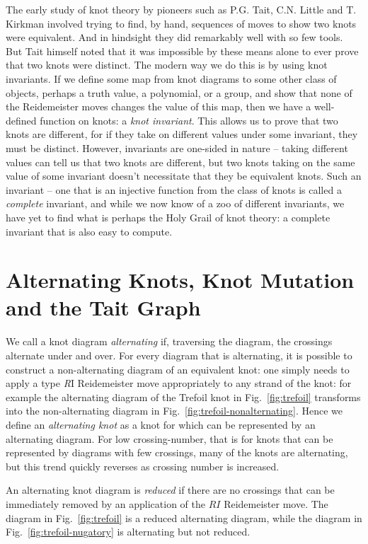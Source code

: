 \documentclass[12pt]{report}
\begin{document}
The early study of knot theory by pioneers such as P.G. Tait, C.N. Little and T. Kirkman involved trying to find, by hand, sequences of moves to show two knots were equivalent. And in hindsight they did remarkably well with so few tools. But Tait himself noted that it was impossible by these means alone to ever prove that two knots were distinct. The modern way we do this is by using knot invariants. If we define some map from knot diagrams to some other class of objects, perhaps a truth value, a polynomial, or a group, and show that none of the Reidemeister moves changes the value of this map, then we have a well-defined function on knots: a \textit{knot invariant}. This allows us to prove that two knots are different, for if they take on different values under some invariant, they must be distinct. However, invariants are one-sided in nature -- taking different values can tell us that two knots are different, but two knots taking on the same value of some invariant doesn't necessitate that they be equivalent knots. Such an invariant -- one that is an injective function from the class of knots is called a \textit{complete} invariant, and while we now know of a zoo of different invariants, we have yet to find what is perhaps the Holy Grail of knot theory: a complete invariant that is also easy to compute.

\section{Alternating Knots, Knot Mutation and the Tait Graph}
We call a knot diagram \textit{alternating} if, traversing the diagram, the crossings alternate under and over. For every diagram that is alternating, it is possible to construct a non-alternating diagram of an equivalent knot: one simply needs to apply a type \textit{R}I Reidemeister move appropriately to any strand of the knot: for example the alternating diagram of the Trefoil knot in Fig.~\ref{fig:trefoil} transforms into the non-alternating diagram in Fig.~\ref{fig:trefoil-nonalternating}. Hence we define an \textit{alternating knot} as a knot for which can be represented by an alternating diagram. For low crossing-number, that is for knots that can be represented by diagrams with few crossings, many of the knots are alternating, but this trend quickly reverses as crossing number is increased.

An alternating knot diagram is \textit{reduced} if there are no crossings that can be immediately removed by an application of the $R\textit{I}$ Reidemeister move. The diagram in Fig.~\ref{fig:trefoil} is a reduced alternating diagram, while the diagram in Fig.~\ref{fig:trefoil-nugatory} is alternating but not reduced.
\end{document}
